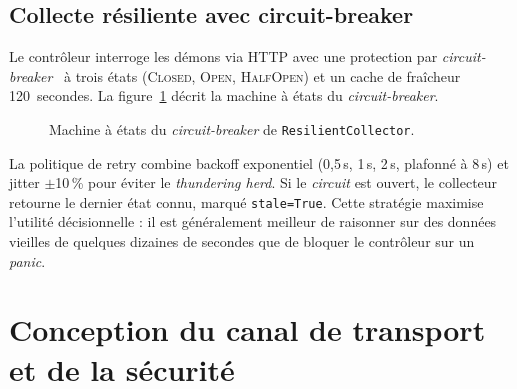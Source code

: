 \subsection{Collecte résiliente avec circuit-breaker}

Le contrôleur interroge les démons via HTTP avec une protection par \emph{circuit-breaker}~\cite{nygard_release} à trois états (\textsc{Closed}, \textsc{Open}, \textsc{HalfOpen}) et un cache de fraîcheur 120~secondes. La figure~\ref{fig:circuit} décrit la machine à états du \emph{circuit-breaker}.

\begin{figure}[H]
\centering
{}
\caption{Machine à états du \emph{circuit-breaker} de \texttt{ResilientCollector}.}
\label{fig:circuit}
\end{figure}

La politique de retry combine backoff exponentiel (0,5\,s, 1\,s, 2\,s, plafonné à 8\,s) et jitter $\pm$10\,\% pour éviter le \emph{thundering herd}. Si le \emph{circuit} est ouvert, le collecteur retourne le dernier état connu, marqué \texttt{stale=True}. Cette stratégie maximise l'utilité décisionnelle : il est généralement meilleur de raisonner sur des données vieilles de quelques dizaines de secondes que de bloquer le contrôleur sur un \emph{panic}.

\section{Conception du canal de transport et de la sécurité}
\label{sec:conception-tls}

